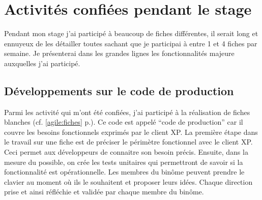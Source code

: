 \chapter{Activités confiées pendant le stage}
Pendant mon stage j'ai participé à beaucoup de fiches différentes, il serait long et ennuyeux de les détailler toutes sachant que je participai à entre 1 et 4 fiches par semaine. Je présenterai dans les grandes lignes les fonctionnalités majeure auxquelles j'ai participé. 
\section{Développements sur le code de production}
Parmi les activité qui m'ont été confiées, j'ai participé à la réalisation de fiches blanches (cf. \ref{agile:fiches} p.\pageref{agile:fiches}). Ce code est appelé ``code de production'' car il couvre les besoins fonctionnels exprimés par le client XP. La première étape dans le travail sur une fiche est de préciser le périmètre fonctionnel avec le client XP. Ceci permet aux développeurs de connaitre son besoin précis. Ensuite, dans la mesure du possible, on crée les tests unitaires qui permettront de savoir si la fonctionnalité est opérationnelle. Les membres du binôme peuvent prendre le clavier au moment où ils le souhaitent et proposer leurs idées. Chaque direction prise et ainsi réfléchie et validée par chaque membre du binôme.
